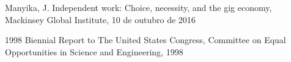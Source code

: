 \documentclass[
12pt,		%
openright,	%
twoside,  %
a4paper,			%
chapter=TITLE,		%
english,			%
french,				%
spanish,			%
brazil				%
]{USPSC-classe/USPSC}
\begin{document}
\begin{flushleft}
\begin{flushleft}
\begin{flushleft}
\begin{flushleft}
\begin{flushleft}
\begin{flushleft}
\begin{flushleft}
\begin{flushleft}
\begin{flushleft}
[Manyika, 2016] Manyika, J. Independent work: Choice, necessity, and the gig economy, Mackinsey Global Institute, 10 de outubro de 2016
\end{flushleft}


\end{flushleft}


\end{flushleft}


\end{flushleft}


\end{flushleft}


\end{flushleft}


\end{flushleft}


\end{flushleft}


\end{flushleft}


\begin{flushleft}
\begin{flushleft}
\begin{flushleft}
\begin{flushleft}
\begin{flushleft}
\begin{flushleft}
\begin{flushleft}
\begin{flushleft}
\begin{flushleft}
[CONGRESS, 1998] 1998 Biennial Report to The United States Congress, Committee on Equal Opportunities in Science and Engineering, 1998
\end{flushleft}


\end{flushleft}


\end{flushleft}


\end{flushleft}


\end{flushleft}


\end{flushleft}


\end{flushleft}


\end{flushleft}


\end{flushleft}
\end{document}
